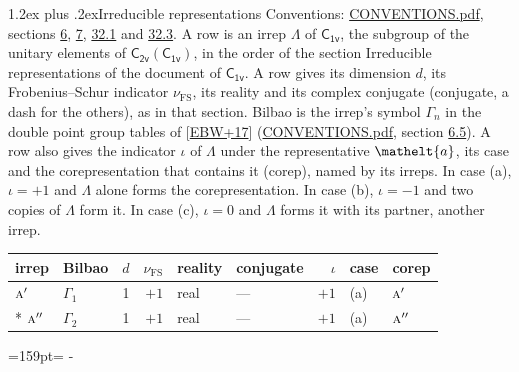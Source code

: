 \documentclass[10pt,a4paper]{article}
\makeatletter
\renewcommand\section{\@startsection{section}{1}{\z@}{-3ex plus -1ex minus -.2ex}%
  {1.2ex plus .2ex}{\normalfont\large\sffamily\bfseries\color{parttitle}}}
\newcommand{\needspace}[1]{\par\penalty-100\begingroup\dimen0=#1\relax\dimen2=\pagegoal
  \advance\dimen2-\pagetotal\ifdim\dimen0>\dimen2\relax\ifdim\dimen2>0pt\vfil\break\fi\fi
  \endgroup}
\numberwithin{equation}{section}
\newcommand{\eltfont}[1]{{\let\sigma\eltsigma\mathelt{#1}}}
\newcommand{\grp}[1]{\mathsf{#1}}
\newcommand{\irr}[1]{\text{\normalfont\scshape #1}}
\newcommand{\elt}[1]{\eltfont{#1}}
\newcommand{\fsind}{\nu_{\mathrm{FS}}}
\makeatother
\begin{document}
\section{Irreducible representations}\label{s:irreps}
Conventions: \href{../../CONVENTIONS.pdf}{CONVENTIONS.pdf}, sections \href{../../../rotation/CONVENTIONS.pdf\#conv.6}{6}, \href{../../../rotation/CONVENTIONS.pdf\#conv.7}{7}, \href{../../CONVENTIONS.pdf\#conv.32.1}{32.1} and \href{../../CONVENTIONS.pdf\#conv.32.3}{32.3}.
\leavevmode\label{n:irrep.Delta}A row is an irrep $\Lambda$ of $\grp{C_{1v}}$, the subgroup of the unitary elements of $\grp{C_{2v}}(\grp{C_{1v}})$, in the order of the section Irreducible representations of the document of \href{../../../rotation/data/pdf/C1v.pdf}{$\grp{C_{1v}}$}. \label{n:index.dimension}\label{n:index.frobenius}\label{n:head.irrep}\label{n:head.reality}\label{n:head.conjugate}A row gives its dimension $d$, its Frobenius--Schur indicator $\fsind$, its reality and its complex conjugate (conjugate, a dash for the others), as in that section. \label{n:head.bilbao}\label{n:irrep.alias.gamma}Bilbao is the irrep's symbol $\Gamma_n$ in the double point group tables of [\href{../../../REFERENCES.pdf\#ref.EBW+17}{EBW+17}] (\href{../../CONVENTIONS.pdf}{CONVENTIONS.pdf}, section \href{../../../rotation/CONVENTIONS.pdf\#conv.6.5}{6.5}). \label{n:head.case.corep}\label{n:head.corep}A row also gives the indicator $\iota$ of $\Lambda$ under the representative $\elt{a}$, its case and the corepresentation that contains it (corep), named by its irreps. In case (a), $\iota = +1$ and $\Lambda$ alone forms the corepresentation. In case (b), $\iota = -1$ and two copies of $\Lambda$ form it. In case (c), $\iota = 0$ and $\Lambda$ forms it with its partner, another irrep.
\setlength{\emergencystretch}{2em}\par\setlength{\emergencystretch}{0pt}
{\small\renewcommand{\arraystretch}{1.25}\setlength{\tabcolsep}{4pt}\begin{longtable}{@{}llrrllrll@{}}\toprule
irrep & Bilbao & $d$ & $\fsind$ & reality & conjugate & $\iota$ & case & corep\\\midrule\endhead
\bottomrule\endfoot\endlastfoot
$\irr{a}'$ & $\Gamma_{1}$ & 1 & $+1$ & real & --- & $+1$ & (a) & $\irr{a}'$\\*
$\irr{a}''$ & $\Gamma_{2}$ & 1 & $+1$ & real & --- & $+1$ & (a) & $\irr{a}''$\\
\bottomrule\end{longtable}}
\needspace{159pt}
\end{document}
